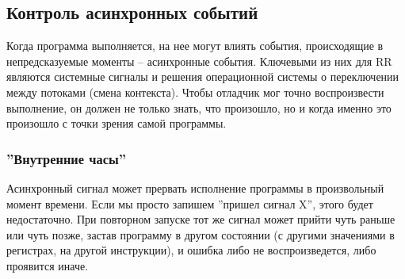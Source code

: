 

\subsection{Контроль асинхронных событий}



Когда программа выполняется, на нее могут влиять события, происходящие в
непредсказуемые моменты – асинхронные события. Ключевыми из них для RR являются
системные сигналы и решения операционной системы о переключении между потоками
(смена контекста). Чтобы отладчик мог точно воспроизвести выполнение, он должен
не только знать, что произошло, но и когда именно это произошло с точки зрения
самой программы.

\subsubsection{''Внутренние часы''}

Асинхронный сигнал может прервать исполнение программы в произвольный момент
времени. Если мы просто запишем ''пришел сигнал X'', этого будет недостаточно.
При повторном запуске тот же сигнал может прийти чуть раньше или чуть позже,
застав программу в другом состоянии (с другими значениями в регистрах, на
другой инструкции), и ошибка либо не воспроизведется, либо проявится иначе.


